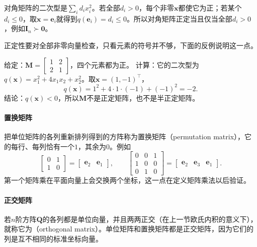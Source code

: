 对角矩阵的二次型是$\sum_id_ix_i^2$。若全部$d_i>0$，每个非零$\bm x$都使它为正；若某个$d_i\leq0$，取$\bm x=\bm e_i$就得到$q(\bm e_i)=d_i\leq0$。所以对角矩阵正定当且仅当全部$d_i>0$，例如$\bm I_n\succ\bm0$。

正定性要对全部非零向量检查，只看元素的符号并不够，下面的反例说明这一点。
\begin{example}[反例：元素全为正的对称矩阵未必正定]
\label{ex:ls-positive-entries-not-pd}
给定：$\bm M=\left[\begin{smallmatrix}1&2\\2&1\end{smallmatrix}\right]$，四个元素都为正。
计算：它的二次型为$q(\bm x)=x_1^2+4x_1x_2+x_2^2$。取$\bm x=(1,-1)^\top$，
\[
 q(\bm x)=1^2+4\cdot1\cdot(-1)+(-1)^2=-2.
\]
结论：$q(\bm x)<0$，所以$\bm M$不是正定矩阵，也不是半正定矩阵。
\end{example}

\paragraph{置换矩阵}
把单位矩阵的各列重新排列得到的方阵称为置换矩阵（permutation matrix），它的每行、每列恰有一个$1$，其余为$0$。例如
\[
 \begin{bmatrix}0&1\\1&0\end{bmatrix}=\begin{bmatrix}\bm e_2&\bm e_1\end{bmatrix},\qquad
 \begin{bmatrix}0&0&1\\1&0&0\\0&1&0\end{bmatrix}=\begin{bmatrix}\bm e_2&\bm e_3&\bm e_1\end{bmatrix}.
\]
第一个矩阵乘在平面向量上会交换两个坐标，这一点在定义矩阵乘法以后验证。

\paragraph{正交矩阵}
\label{sec:ls-orthogonal-matrices}
若$n$阶方阵$\bm Q$的各列都是单位向量，并且两两正交（在上一节欧氏内积的意义下），就称它为（orthogonal matrix）。单位矩阵和置换矩阵都是正交矩阵，因为它们的列是互不相同的标准坐标向量。

